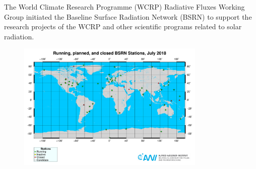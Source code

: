The World Climate Research Programme (WCRP) Radiative Fluxes Working Group initiated the Baseline Surface Radiation Network (BSRN) to support the research projects of the WCRP and other scientific programs related to solar radiation.


\begin{figure}
  \centering
  \includegraphics[width=0.8\textwidth]{DataMethodsFIGS/bsrn.pdf}
  \caption{}
 \label{fig:bsrnstations}
\end{figure}
  





